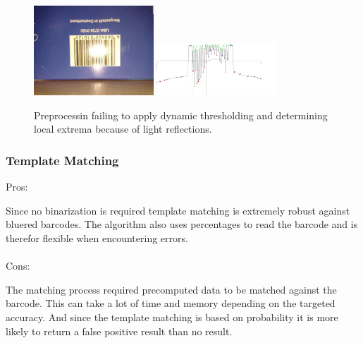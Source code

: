 \begin{figure}[t]
\center
\includegraphics[width=0.4\textwidth,natwidth=800,natheight=600]{img/wachenfeldfail.jpg}
\hspace{1cm}
\includegraphics[width=0.4\textwidth,natwidth=1800,natheight=800]{img/wachenfeldfail2.jpg}
\caption{Preprocessin failing to apply dynamic thresholding and determining local extrema because of light reflections.}
\label{failwachenfeld}
\end{figure}
 
\subsubsection*{Template Matching}
Pros:

Since no binarization is required template matching is extremely robust against bluered barcodes. The algorithm also uses percentages to read the barcode and is therefor flexible when encountering errors. 
\\
\\
Cons:

The matching process required precomputed data to be matched against the barcode. This can take a lot of time and memory depending on the targeted accuracy. And since the template matching is based on probability it is more likely to return a false positive result than no result.


